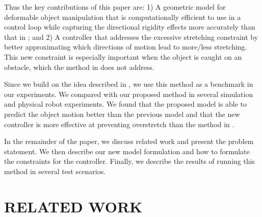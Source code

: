 Thus the key contributions of this paper are:
1) A geometric model for deformable object manipulation that is computationally efficient to use in a control loop while capturing the directional rigidity effects more accurately than that in \cite{Berenson2013}; and
2) A controller that addresses the excessive stretching constraint by better approximating which directions of motion lead to more/less stretching. This new constraint is especially important when the object is caught on an obstacle, which the method in \cite{Berenson2013} does not address.




Since we build on the idea described in \cite{Berenson2013}, we use this method as a benchmark in our experiments. 
We compared \cite{Berenson2013} with our proposed method in several simulation and physical robot experiments. We found that the proposed model is able to predict the object motion better than the previous model and that the new controller is more effective at preventing overstretch than the method in \cite{Berenson2013}.

In the remainder of the paper, we discuss related work and present the problem statement. We then describe our new model formulation and how to formulate the constraints for the controller. Finally, we describe the results of running this method in several test scenarios.


\section{RELATED WORK}


